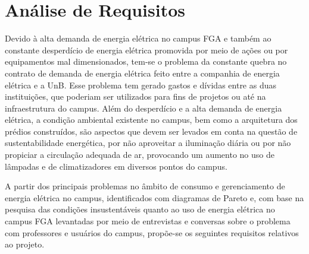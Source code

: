 \chapter[Análise de Requisitos]{Análise de Requisitos}

Devido à alta demanda de energia elétrica no campus FGA e também ao constante desperdício de energia elétrica promovida por meio de ações ou por equipamentos mal dimensionados, tem-se o problema da constante quebra no contrato de demanda de energia elétrica feito entre a companhia de energia elétrica e a UnB. Esse problema tem gerado gastos e dívidas entre as duas instituições, que poderiam ser utilizados para fins de projetos ou até na infraestrutura do campus. Além do desperdício e a alta demanda de energia elétrica, a condição ambiental existente no campus, bem como a arquitetura dos prédios construídos, são aspectos que devem ser levados em conta na questão de sustentabilidade energética, por não aproveitar a iluminação diária ou por não propiciar a circulação adequada de ar, provocando um aumento no uso de lâmpadas e de climatizadores em diversos pontos do campus.

A partir dos principais problemas no âmbito de consumo e gerenciamento de energia elétrica no campus, identificados com diagramas de Pareto e, com base na pesquisa das condições insustentáveis quanto ao uso de energia elétrica no campus FGA levantadas por meio de entrevistas e conversas sobre o problema com professores e usuários do campus, propõe-se os seguintes requisitos relativos ao projeto.

